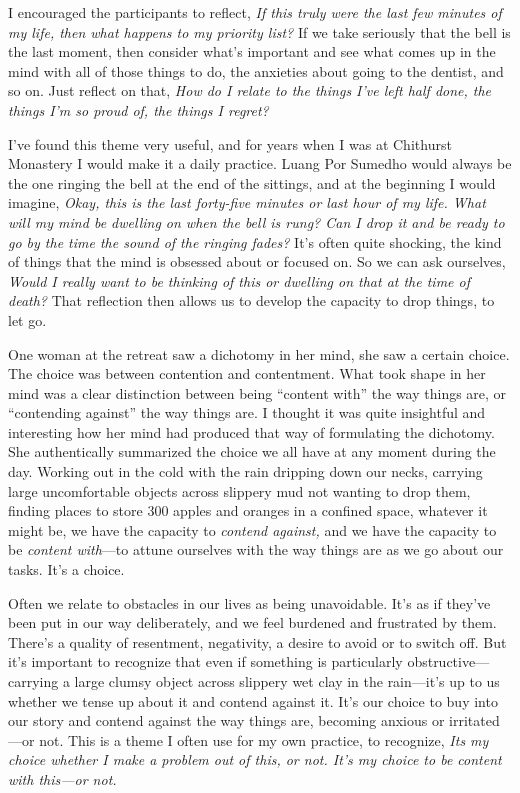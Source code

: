 I encouraged the participants to reflect, \emph{If this truly were the 
last few minutes of my life, then what happens to my priority list?} If 
we take seriously that the bell is the last moment, then consider 
what's important and see what comes up in the mind with all of those 
things to do, the anxieties about going to the dentist, and so on. Just 
reflect on that, \emph{How do I relate to the things I've left half 
done, the things I'm so proud of, the things I regret?}

I've found this theme very useful, and for years when I was at 
Chithurst Monastery I would make it a daily practice. Luang Por Sumedho 
would always be the one ringing the bell at the end of the sittings, 
and at the beginning I would imagine, \emph{Okay, this is the last 
forty-five minutes or last hour of my life. What will my mind be 
dwelling on when the bell is rung? Can I drop it and be ready to go by 
the time the sound of the ringing fades?} It's often quite shocking, 
the kind of things that the mind is obsessed about or focused on. So we 
can ask ourselves, \emph{Would I really want to be thinking of this or 
dwelling on that at the time of death?} That reflection then allows us 
to develop the capacity to drop things, to let go.

One woman at the retreat saw a dichotomy in her mind, she saw a certain 
choice. The choice was between contention and contentment. What took 
shape in her mind was a clear distinction between being ``content 
with'' the way things are, or ``contending against'' the way things 
are. I thought it was quite insightful and interesting how her mind had 
produced that way of formulating the dichotomy. She authentically 
summarized the choice we all have at any moment during the day. Working 
out in the cold with the rain dripping down our necks, carrying large 
uncomfortable objects across slippery mud not wanting to drop them, 
finding places to store 300 apples and oranges in a confined space, 
whatever it might be, we have the capacity to \emph{contend against,} 
and we have the capacity to be \emph{content with}---to attune 
ourselves with the way things are as we go about our tasks. It's a 
choice.

Often we relate to obstacles in our lives as being unavoidable. It's as 
if they've been put in our way deliberately, and we feel burdened and 
frustrated by them. There's a quality of resentment, negativity, a 
desire to avoid or to switch off. But it's important to recognize that 
even if something is particularly obstructive---carrying a large clumsy 
object across slippery wet clay in the rain---it's up to us whether we 
tense up about it and contend against it. It's our choice to buy into 
our story and contend against the way things are, becoming anxious or 
irritated---or not. This is a theme I often use for my own practice, to 
recognize, \emph{Its my choice whether I make a problem out of this, or 
not. It's my choice to be content with this---or not.}

